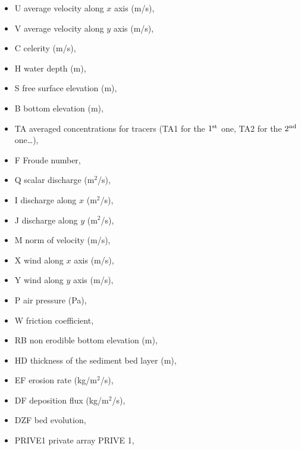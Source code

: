 \begin{itemize}
\item U average velocity along $x$ axis (m/s),

\item V average velocity along $y$ axis (m/s),

\item C celerity (m/s),

\item H water depth (m),

\item S free surface elevation (m),

\item B bottom elevation (m),

\item TA averaged concentrations for tracers (TA1 for the ${1}^{\rm{st}}$ one, TA2 for the
${2}^{\rm{nd}}$ one\dots ),

\item F Froude number,

\item Q scalar discharge (m${}^{2}$/s),

\item I discharge along $x$ (m${}^{2}$/s),

\item J discharge along $y$ (m${}^{2}$/s),

\item M norm of velocity (m/s),

\item X wind along $x$ axis (m/s),

\item Y wind along $y$ axis (m/s),

\item P air pressure (Pa),

\item W friction coefficient,

\item RB non erodible bottom elevation (m),

\item HD thickness of the sediment bed layer (m),

\item EF erosion rate (kg/m${}^{2}$/s),

\item DF deposition flux (kg/m${}^{2}$/s),

\item DZF bed evolution,

\item PRIVE1 private array PRIVE 1,


\end{itemize}
